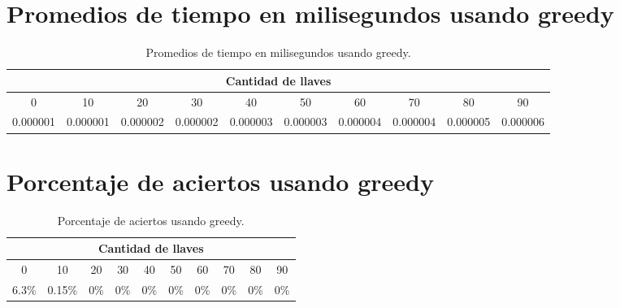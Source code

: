 \documentclass[a4paper]{article}
\begin{document}
\section{Promedios de tiempo en milisegundos usando greedy}

\begin{table}[H]
\centering
\relax
\resizebox{\textwidth}{!} {%
\begin{tabular}{|c|c|c|c|c|c|c|c|c|c|}
\hline
 \multicolumn{10}{|c|}{\textbf{Cantidad de llaves}} \\
 \hline 
0 & 10 & 20 & 30 & 40 & 50 & 60 & 70 & 80 & 90 \\
\hline
0.000001 & 0.000001 & 0.000002 & 0.000002 & 0.000003 & 0.000003 & 0.000004 & 0.000004 & 0.000005 & 0.000006 \\
\hline
\end{tabular}%
}
\caption{Promedios de tiempo en milisegundos usando greedy.}
\end{table}
\section{Porcentaje de aciertos usando greedy}

\begin{table}[H]
\centering
\relax
\resizebox{\textwidth}{!} {%
\begin{tabular}{|c|c|c|c|c|c|c|c|c|c|}
\hline
 \multicolumn{10}{|c|}{\textbf{Cantidad de llaves}} \\
 \hline 
0 & 10 & 20 & 30 & 40 & 50 & 60 & 70 & 80 & 90 \\
\hline
6.3\% & 0.15\% & 0\% & 0\% & 0\% & 0\% & 0\% & 0\% & 0\% & 0\% \\
\hline
\end{tabular}%
}
\caption{Porcentaje de aciertos usando greedy.}
\end{table}
\end{document}
